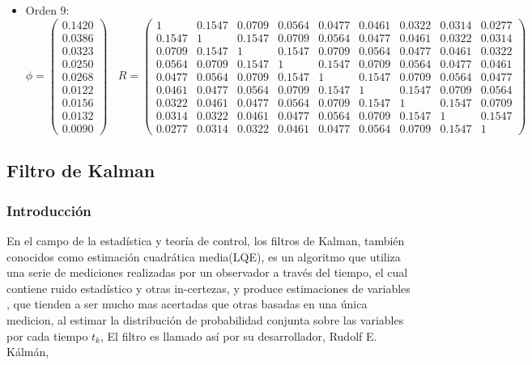 \begin{itemize}
\item Orden 9:
\begin{equation*}
	\phi = 
	\begin{pmatrix}
		0.1420 \\
		0.0386 \\
		0.0323 \\
		0.0250 \\
		0.0268 \\
		0.0122 \\
		0.0156 \\
		0.0132 \\
		0.0090
	\end{pmatrix}	\	\	\	\
	R =
	\begin{pmatrix}	
	1 & 0.1547 & 0.0709 & 0.0564 & 0.0477 & 0.0461 & 0.0322 & 0.0314 & 0.0277 \\
	0.1547 & 1 & 0.1547 & 0.0709 & 0.0564 & 0.0477 & 0.0461 & 0.0322 & 0.0314 \\
	0.0709 & 0.1547 & 1 & 0.1547 & 0.0709 & 0.0564 & 0.0477 & 0.0461 & 0.0322 \\
	0.0564 & 0.0709 & 0.1547 & 1 & 0.1547 & 0.0709 & 0.0564 & 0.0477 & 0.0461 \\
	0.0477 & 0.0564 & 0.0709 & 0.1547 & 1 & 0.1547 & 0.0709 & 0.0564 & 0.0477 \\
	0.0461 & 0.0477 & 0.0564 & 0.0709 & 0.1547 & 1 & 0.1547 & 0.0709 & 0.0564 \\
	0.0322 & 0.0461 & 0.0477 & 0.0564 & 0.0709 & 0.1547 & 1 & 0.1547 & 0.0709 \\
	0.0314 & 0.0322 & 0.0461 & 0.0477 & 0.0564 & 0.0709 & 0.1547 & 1 & 0.1547 \\
	0.0277 & 0.0314 & 0.0322 & 0.0461 & 0.0477 & 0.0564 & 0.0709 & 0.1547 & 1	  
	\end{pmatrix}
\end{equation*}

\end{itemize}

\subsection{Filtro de Kalman}

\subsubsection{Introducción}
En el campo de la estadística y teoría de control, los filtros de Kalman, también conocidos como estimación cuadrática media(LQE), es un algoritmo que utiliza una serie de mediciones realizadas por un observador a través del tiempo, el cual contiene ruido estadístico y otras in-certezas, y  produce estimaciones de variables , que tienden a ser mucho mas acertadas que otras basadas en una única medicion, al estimar la distribución de probabilidad conjunta sobre las variables por cada tiempo $t_k$, El filtro es llamado así por su desarrollador, Rudolf E. Kálmán,

